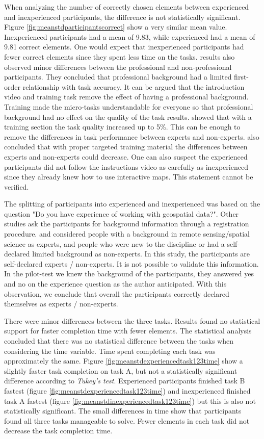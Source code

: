 When analyzing the number of correctly chosen elements between experienced and inexperienced participants, the difference is not statistically significant. Figure \ref{fig:meanstdparticipantscorrect} show a very similar mean value. Inexperienced participants had a mean of 9.83, while experienced had a mean of 9.81 correct elements. One would expect that inexperienced participants had fewer correct elements since they spent less time on the tasks. \cite{Salk2016} results also observed minor differences between the professional and non-professional participants. They concluded that professional background had a limited first-order relationship with task accuracy. It can be argued that the introduction video and training task remove the effect of having a professional background. Training made the micro-tasks understandable for everyone so that professional background had no effect on the quality of the task results. \cite{Gadiraju2015a} showed that with a training section the task quality increased up to 5\%. This can be enough to remove the differences in task performance between experts and non-experts. \cite{See2013} also concluded that with proper targeted training material the differences between experts and non-experts could decrease. One can also suspect the experienced participants did not follow the instructions video as carefully as inexperienced since they already knew how to use interactive maps. This statement cannot be verified.

The splitting of participants into experienced and inexperienced was based on the question "Do you have experience of working with geospatial data?". Other studies ask the participants for background information through a registration procedure. \cite{See2013} and \cite{Salk2016} considered people with a background in remote sensing/spatial science as experts, and people who were new to the discipline or had a self-declared limited background as non-experts. In this study, the participants are self-declared experts / non-experts. It is not possible to validate this information. In the pilot-test we knew the background of the participants, they answered yes and no on the experience question as the author anticipated. With this observation, we conclude that overall the participants correctly declared themselves as experts / non-experts.

There were minor differences between the three tasks. Results found no statistical support for faster completion time with fewer elements. The statistical analysis concluded that there was no statistical difference between the tasks when considering the time variable. Time spent completing each task was approximately the same. Figure \ref{fig:meanstdexperiencedtask123time} show a slightly faster task completion on task A, but not a statistically significant difference according to \textit{Tukey's test}. Experienced participants finished task B fastest (figure \ref{fig:meanstdexperiencedtask123time}) and inexperienced finished task A fastest (figure \ref{fig:meanstdinexperiencedtask123time}) but this is also not statistically significant. The small differences in time show that participants found all three tasks manageable to solve. Fewer elements in each task did not decrease the task completion time.

